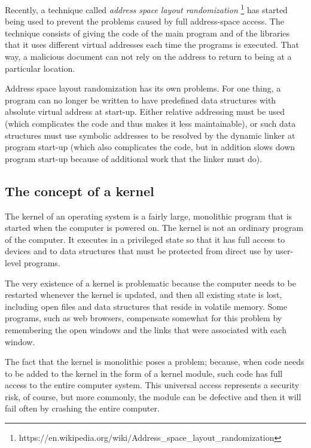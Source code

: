 Recently, a technique called \emph{address space layout
  randomization}%
\footnote{https://en.wikipedia.org/wiki/Address\_space\_layout\_randomization}
has started being used to prevent the problems caused by full
address-space access.  The technique consists of giving the code of
the main program and of the libraries that it uses different virtual
addresses each time the programs is executed.  That way, a malicious
document can not rely on the address to return to being at a
particular location.

Address space layout randomization has its own problems.  For one
thing, a program can no longer be written to have predefined data
structures with absolute virtual address at start-up.  Either relative
addressing must be used (which complicates the code and thus makes it
less maintainable), or such data structures must use symbolic
addresses to be resolved by the dynamic linker at program start-up
(which also complicates the code, but in addition slows down program
start-up because of additional work that the linker must do).

\subsection{The concept of a kernel}

The kernel of an operating system is a fairly large, monolithic
program that is started when the computer is powered on. The kernel is
not an ordinary program of the computer. It executes in a privileged
state so that it has full access to devices and to data structures
that must be protected from direct use by user-level programs.

The very existence of a kernel is problematic because the computer
needs to be restarted whenever the kernel is updated, and then all
existing state is lost, including open files and data structures that
reside in volatile memory. Some programs, such as web browsers,
compensate somewhat for this problem by remembering the open windows
and the links that were associated with each window.

The fact that the kernel is monolithic poses a problem; because, when
code needs to be added to the kernel in the form of a kernel module,
such code has full access to the entire computer system. This
universal access represents a security risk, of course, but more
commonly, the module can be defective and then it will fail often by
crashing the entire computer.

